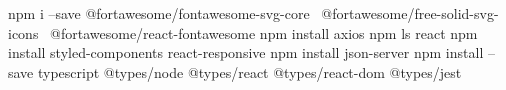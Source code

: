 npm i --save @fortawesome/fontawesome-svg-core \ @fortawesome/free-solid-svg-icons \ @fortawesome/react-fontawesome
npm install axios
 npm ls react
npm install styled-components react-responsive
 npm install json-server
  npm install --save typescript @types/node @types/react @types/react-dom @types/jest